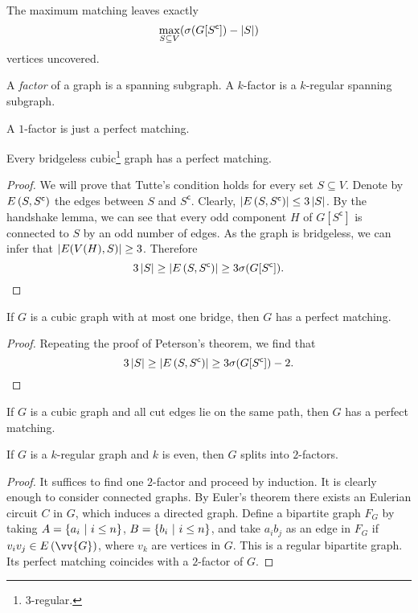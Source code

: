 \begin{izrek}
The maximum matching leaves exactly
\[
\max_{S \subseteq V} (\sigma(G[S^{\mathsf{c}}]) - \left\lvert S\right\rvert)
\]
vertices uncovered.
\end{izrek}


\begin{definicija}
A \emph{factor} of a graph is a spanning subgraph. A
$k$-factor is a $k$-regular spanning subgraph.
\end{definicija}

\begin{opomba}
A $1$-factor is just a perfect matching.
\end{opomba}

\begin{izrek}[Peterson]
Every bridgeless cubic\footnote{$3$-regular.} graph has a perfect
matching.
\end{izrek}

\begin{proof}
We will prove that Tutte's condition holds for every set
$S \subseteq V$. Denote by $E \left(S, S^{\mathsf{c}}\right)$ the edges
between $S$ and $S^{\mathsf{c}}$. Clearly,
$\left\lvert E \left(S, S^{\mathsf{c}}\right)\right\rvert \leq 3 \left\lvert S\right\rvert$. By the handshake
lemma, we can see that every odd component $H$ of
$G[S^{\mathsf{c}}]$ is connected to $S$ by an odd number of edges.
As the graph is bridgeless, we can infer that
$\left\lvert E(V(H), S)\right\rvert \geq 3$. Therefore
\[
3 \left\lvert S\right\rvert \geq
\left\lvert E \left(S, S^{\mathsf{c}}\right)\right\rvert \geq
3 \sigma(G[S^{\mathsf{c}}]). \qedhere
\]
\end{proof}

\begin{izrek}
If $G$ is a cubic graph with at most one bridge, then $G$ has a
perfect matching.
\end{izrek}

\begin{proof}
Repeating the proof of Peterson's theorem, we find that
\[
3 \left\lvert S\right\rvert \geq
\left\lvert E \left(S, S^{\mathsf{c}}\right)\right\rvert \geq
3 \sigma(G[S^{\mathsf{c}}]) - 2. \qedhere
\]
\end{proof}

\begin{izrek}
If $G$ is a cubic graph and all cut edges lie on the same path, then $G$ has a
perfect matching.
\end{izrek}

\begin{izrek}
If $G$ is a $k$-regular graph and $k$ is even, then $G$ splits into
$2$-factors.
\end{izrek}

\begin{proof}
It suffices to find one $2$-factor and proceed by induction. It is
clearly enough to consider connected graphs. By Euler's theorem
there exists an Eulerian circuit $C$ in $G$, which induces a
directed graph. Define a bipartite graph $F_G$ by taking
$A = \left\{a_i~\middle\vert~i \leq n\right\}$, $B = \left\{b_i~\middle\vert~i \leq n\right\}$, and take
$a_i b_j$ as an edge in $F_G$ if $v_i v_j \in E \br{\vv{G}}$, where
$v_k$ are vertices in $G$. This is a regular bipartite graph. Its
perfect matching coincides with a $2$-factor of $G$.
\end{proof}

